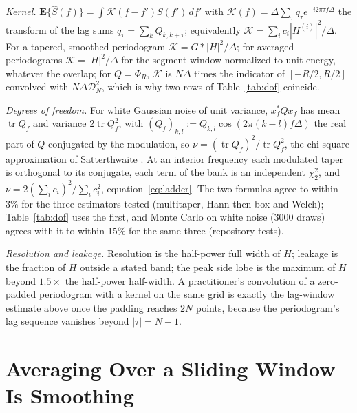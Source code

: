 \documentclass[10pt,twocolumn]{article}
\newcommand{\E}{\mathbf{E}}
\newcommand{\dd}{\,d}
\begin{document}
\emph{Kernel.} $\E\{\hat S(f)\}=\int\mathcal{K}(f-f')S(f')\dd f'$ with $\mathcal{K}(f)=\Delta\sum_\tau q_\tau e^{-i2\pi\tau f\Delta}$ the transform of the lag sums $q_\tau=\sum_kQ_{k,k+\tau}$; equivalently $\mathcal{K}=\sum_ic_i|H^{(i)}|^2/\Delta$. For a tapered, smoothed periodogram $\mathcal{K}=G*|H|^2/\Delta$; for averaged periodograms $\mathcal{K}=|H|^2/\Delta$ for the segment window normalized to unit energy, whatever the overlap; for $Q=\Phi_R$, $\mathcal{K}$ is $N\Delta$ times the indicator of $[-R/2,R/2]$ convolved with $N\Delta\mathcal{D}_N^2$, which is why two rows of Table~\ref{tab:dof} coincide.

\emph{Degrees of freedom.} For white Gaussian noise of unit variance, $x_f^{*}Qx_f$ has mean $\operatorname{tr}Q_f$ and variance $2\operatorname{tr}Q_f^2$, with $(Q_f)_{k,l}:=Q_{k,l}\cos(2\pi(k-l)f\Delta)$ the real part of $Q$ conjugated by the modulation, so $\nu=(\operatorname{tr}Q_f)^2/\operatorname{tr}Q_f^2$, the chi-square approximation of Satterthwaite \cite{satterthwaite1946}. At an interior frequency each modulated taper is orthogonal to its conjugate, each term of the bank is an independent $\chi^2_2$, and $\nu=2(\sum_ic_i)^2/\sum_ic_i^2$, equation~\eqref{eq:ladder}. The two formulas agree to within 3\% for the three estimators tested (multitaper, Hann-then-box and Welch); Table~\ref{tab:dof} uses the first, and Monte Carlo on white noise (3000 draws) agrees with it to within 15\% for the same three (repository tests).

\emph{Resolution and leakage.} Resolution is the half-power full width of $H$; leakage is the fraction of $H$ outside a stated band; the peak side lobe is the maximum of $H$ beyond $1.5\times$ the half-power half-width. A practitioner's convolution of a zero-padded periodogram with a kernel on the same grid is exactly the lag-window estimate above once the padding reaches $2N$ points, because the periodogram's lag sequence vanishes beyond $|\tau|=N-1$.


\section{Averaging Over a Sliding Window Is Smoothing}
\label{app:welch}
\end{document}
